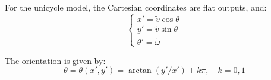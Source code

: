 \documentclass[openany]{book}
\theoremstyle{definition}
\theoremstyle{remark}
\begin{document}
For the unicycle model, the Cartesian coordinates are flat outputs, and:
\begin{equation}
    \begin{cases}
    x' = \tilde{v}\cos\theta \\
    y' = \tilde{v}\sin\theta \\
    \theta' = \tilde{\omega}
    \end{cases}
\end{equation}

The orientation is given by:
\begin{equation}
    \theta = \theta(x', y') = \arctan(y'/x') + k\pi, \quad k = 0,1
\end{equation}
\end{document}
